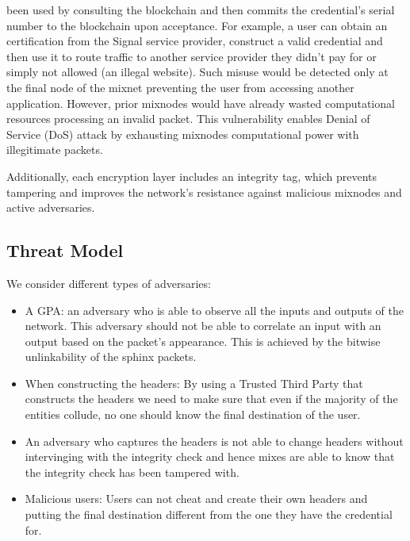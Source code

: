 been used by consulting the blockchain and then commits the credential's
serial number to the blockchain upon acceptance.  For example, a user can
obtain an certification from the Signal service provider, construct a valid
credential and then use it to route traffic to another service provider
they didn't pay for or simply not allowed (an illegal website).  Such
misuse would be detected only at the final node of the mixnet preventing
the user from accessing another application.  However, prior mixnodes would
have already wasted computational resources processing an invalid packet.
This vulnerability enables Denial of Service (DoS) attack by exhausting
mixnodes computational power with illegitimate packets.

Additionally, each encryption layer includes an integrity tag, which prevents tampering and improves the network’s resistance against malicious mixnodes and active adversaries.

\subsection{Threat Model} 

We consider different types of adversaries:
\begin{itemize}
	\item A GPA: an adversary who is able to observe all the inputs and outputs of the network. This adversary should not be able to correlate an input with an output based on the packet's appearance. This is achieved by the bitwise unlinkability of the sphinx packets.
	\item When constructing the headers: By using a Trusted Third Party that constructs the headers we need to make sure that even if the majority of the entities collude, no one should know the final destination of the user.
	\item An adversary who captures the headers is not able to change headers without intervinging with the integrity check and hence mixes are able to know that the integrity check has been tampered with.
	\item Malicious users: Users can not cheat and create their own headers and putting the final destination different from the one they have the credential for.
\end{itemize}

